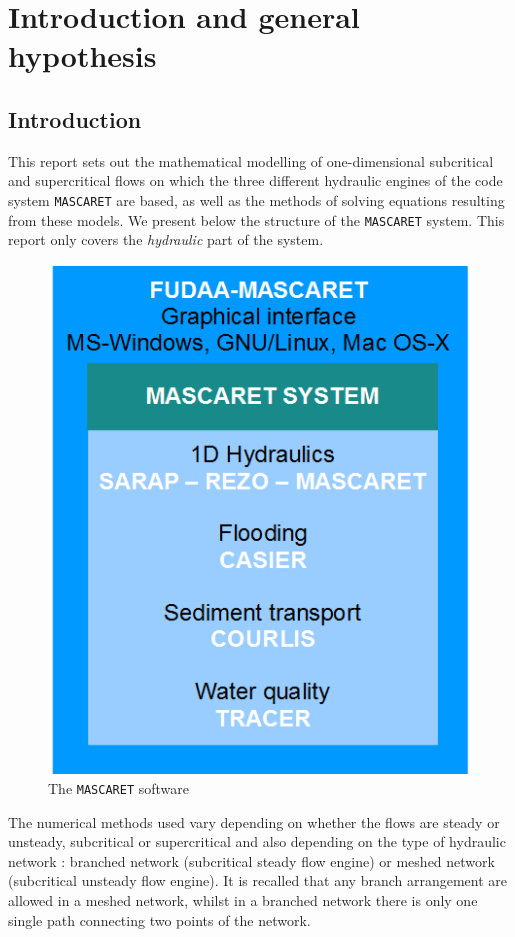 \section{Introduction and general hypothesis}

\subsection{Introduction}

This report sets out the mathematical modelling of one-dimensional subcritical
and supercritical flows on which the three different hydraulic engines of the
code system \texttt{MASCARET} are based, as well as the methods of solving
equations resulting from these models.
We present below the structure of the \texttt{MASCARET} system. This report
only covers the \textit{hydraulic} part of the system.

\begin{figure}[h]
 \begin{center}
  \includegraphics[scale=1.5]{Figures/MASCARET_system.eps}
  \caption{The \texttt{MASCARET} software}
 \end{center}
\end{figure}

The numerical methods used vary depending on whether the flows are steady or
unsteady, subcritical or supercritical and also depending on the type of
hydraulic network : branched network (subcritical steady flow engine) or meshed
network (subcritical unsteady flow engine). It is recalled that any branch
arrangement are allowed in a meshed network, whilst in a branched network there
is only one single path connecting two points of the network.

